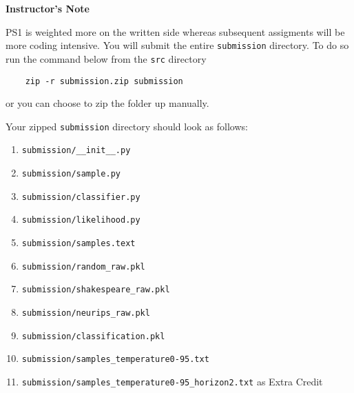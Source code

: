 \textbf{Instructor's Note}

PS1 is weighted more on the written side whereas subsequent assigments will be more coding intensive. 
You will submit the entire \texttt{submission} directory. To do so run the command  below from the \texttt{src} directory
\begin{verbatim}
    zip -r submission.zip submission
\end{verbatim}

or you can choose to zip the folder up manually.

Your zipped \texttt{submission} directory should look as follows:
\begin{enumerate}
    \item \texttt{submission/\_\_init\_\_.py}
    \item \texttt{submission/sample.py}
    \item \texttt{submission/classifier.py}
    \item \texttt{submission/likelihood.py}
    \item \texttt{submission/samples.text}
    \item \texttt{submission/random\_raw.pkl}
    \item \texttt{submission/shakespeare\_raw.pkl}
    \item \texttt{submission/neurips\_raw.pkl}
    \item \texttt{submission/classification.pkl}
    \item \texttt{submission/samples\_temperature0-95.txt}
    \item \texttt{submission/samples\_temperature0-95\_horizon2.txt} as Extra Credit
\end{enumerate}
